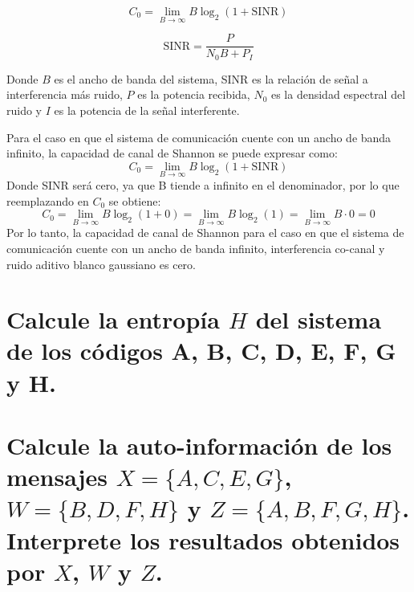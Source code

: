 \documentclass[
  11pt,
  letterpaper,
  answers
]{exam}
\begin{document}
\begin{questions}
\[
C_0 = \lim_{B \to \infty} B \log_2 (1 + \text{SINR})
\]


\[
\text{SINR} = \frac{P}{N_0 B + P_{I}}
\]

Donde \(B\) es el ancho de banda del sistema, SINR es la relación de señal a interferencia más ruido, \(P\) es la potencia recibida, \(N_0\) es la densidad espectral del ruido y \(I\) es la potencia de la señal interferente.
\begin{solution}
Para el caso en que el sistema de comunicación cuente con un ancho de banda infinito, la capacidad de canal de Shannon se puede expresar como: 
\begin{equation}
    C_0 = \lim_{B \to \infty} B \log_2 (1 + \text{SINR})
\end{equation}
Donde SINR será cero, ya que B tiende a infinito en el denominador, por lo que reemplazando en $C_0$ se obtiene:
\begin{equation}
    C_0 = \lim_{B \to \infty} B \log_2 (1 + 0) = \lim_{B \to \infty} B \log_2 (1) = \lim_{B \to \infty} B \cdot 0 = 0
\end{equation}
Por lo tanto, la capacidad de canal de Shannon para el caso en que el sistema de comunicación cuente con un ancho de banda infinito, interferencia co-canal y ruido aditivo blanco gaussiano es cero.
\end{solution}
\begin{parts}
    \part{Calcule la entropía \( H \) del sistema de los códigos A, B, C, D, E, F, G y H.}
    \part{Calcule la auto-información de los mensajes \( X = \{A, C, E, G\} \), \( W = \{B, D, F, H\} \) y \( Z = \{A, B, F, G, H\} \). Interprete los resultados obtenidos por \( X \), \( W \) y \( Z \).}
\end{parts}
\begin{solution}
\begin{parts}

\end{parts}
\end{solution}
\end{questions}
\end{document}
